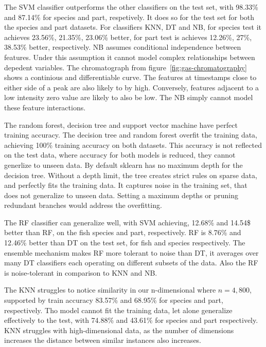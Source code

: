 \documentclass[runningheads]{llncs}
\begin{document}
The SVM classifier outperforms the other classifiers on the test set, with 98.33\% and 87.14\% for species and part, respetively. 
It does so for the test set for both the species and part datasets.
For classifiers KNN, DT and NB, for species test it achieves 23.56\%, 21.35\%, 23.06\% better, for part test is achieves 12.26\%, 27\%, 38.53\% better, respectively.
NB assumes conditional independence between features.
Under this assumption it cannot model complex relationships between depedent variables.
The chromatograph from figure~\ref{fig:gas-chromatography} shows a continious and differentiable curve. 
The features at timestamps close to either side of a peak are also likely to by high. 
Conversely, features adjacent to a low intensity zero value are likely to also be low. 
The NB simply cannot model these feature interactions.


The random forest, decision tree and support vector machine have perfect training accuracy.
The decision tree and random forest overfit the training data, achieving 100\% training accuracy on both datasets.
This accuracy is not reflected on the test data, where accuracy for both models is reduced, they cannot generlize to unseen data. 
By default sklearn has no maximum depth for the decision tree.
Without a depth limit, the tree creates strict rules on sparse data, and perfectly fits the training data.
It captures noise in the training set, that does not generalize to unseen data. 
Setting a maximum depths or pruning redundant branches would address the overfitting. 

The RF classifier can generalize well, with SVM achieving, 12.68\% and 14.54\$ better than RF, on the fish species and part, respectively.
RF is 8.76\% and 12.46\% better than DT on the test set, for fish and species respectively. 
The ensemble mechanism makes RF more tolerant to noise than DT, it averages over many DT classifiers each operating on different subsets of the data. 
Also the RF is noise-tolerant in comparison to KNN and NB.

The KNN struggles to notice similarity in our n-dimensional where $n=4,800$, supported by train accuracy 83.57\% and 68.95\% for species and part, respectively. Tho model cannot fit the training data, let alone generalize effectively to the test, with 74.88\% and 43.61\% for species and part respectively. 
KNN struggles with high-dimensional data, as the number of dimensions increases the distance between similar instances also increases. 
\end{document}
